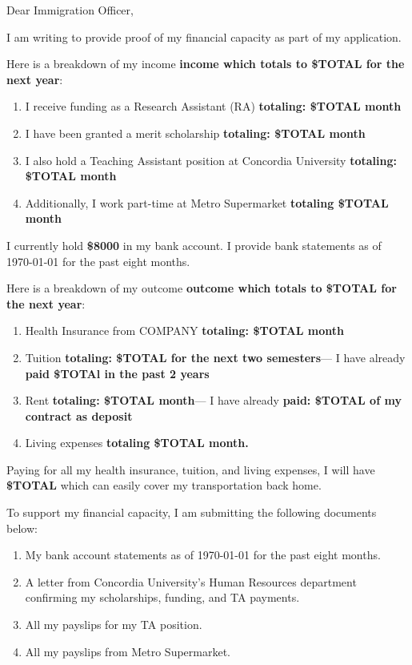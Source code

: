 \documentclass{letter}
\begin{document}
\begin{letter}{}
\opening {Dear Immigration Officer,}

I am writing to provide proof of my financial capacity as part of my application. 

Here is a breakdown of my income \textbf{income which totals to \$TOTAL for the next year}:
\begin{enumerate}
    \item I receive funding as a Research Assistant (RA) \textbf{totaling: \$TOTAL \/ month} 
    \item I have been granted a merit scholarship \textbf{totaling: \$TOTAL \/ month}
    \item I also hold a Teaching Assistant position at Concordia University \textbf{totaling: \$TOTAL \/ month}
    \item Additionally, I work part-time at Metro Supermarket \textbf{totaling \$TOTAL \/ month}
\end{enumerate}

I currently hold \textbf{\$8000} in my bank account. 
I provide bank statements as of \today{} for the past eight months. 

Here is a breakdown of my outcome \textbf{outcome which totals to \$TOTAL for the next year}:
\begin{enumerate}
    \item Health Insurance from COMPANY \textbf{totaling: \$TOTAL \/ month}
    \item Tuition \textbf{totaling: \$TOTAL for the next two semesters}---
    I have already \textbf{paid \$TOTAl in the past 2 years}
    \item Rent \textbf{totaling: \$TOTAL \/month}---
    I have already \textbf{paid: \$TOTAL of my contract as deposit}
    \item Living expenses \textbf{totaling \$TOTAL \/month.}
\end{enumerate}

Paying for all my health insurance, tuition, and living expenses, I will have \textbf{\$TOTAL} which can easily cover my transportation back home. 


To support my financial capacity, I am submitting the following documents below:
\begin{enumerate}
    \item My bank account statements as of \today{} for the past eight months.
    \item A letter from Concordia University's Human Resources department confirming my scholarships, funding, and TA payments.
    \item All my payslips for my TA position. 
    \item All my payslips from Metro Supermarket.
\end{enumerate}


\end{letter}
\end{document}
